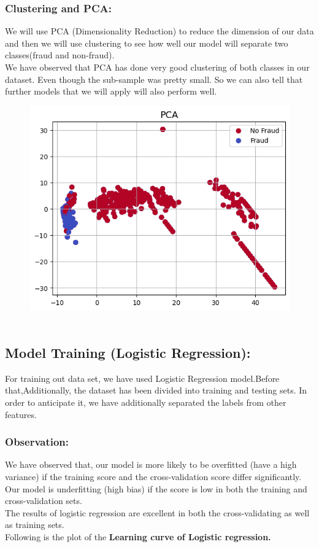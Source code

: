 \documentclass{article}
\begin{document}
\subsubsection{Clustering and PCA:}
We will use PCA (Dimensionality Reduction) to reduce the dimension of our data and then we will use clustering to see how well our model will separate two classes(fraud and non-fraud).\\
We have observed that PCA has done very good clustering of both classes in our dataset. Even though the sub-sample was pretty small. So we can also tell that further models that we will apply will also perform well.

\begin{figure}[!h]
\centering
\includegraphics[width = 2.33 in]{img7.png}~
\end{figure}

\subsection{Model Training (Logistic Regression):}
For training out data set, we have used Logistic Regression model.Before that,Additionally, the dataset has been divided into training and testing sets. In order to anticipate it, we have additionally separated the labels from other features.

\subsubsection{Observation:}
We have observed that, our model is more likely to be overfitted (have a high variance) if the training score and the cross-validation score differ significantly.\\
Our model is underfitting (high bias) if the score is low in both the training and cross-validation sets.\\
The results of logistic regression are excellent in both the cross-validating as well as training sets.\\
Following is the plot of the \textbf{Learning curve of Logistic regression.}
\\\\
\end{document}
